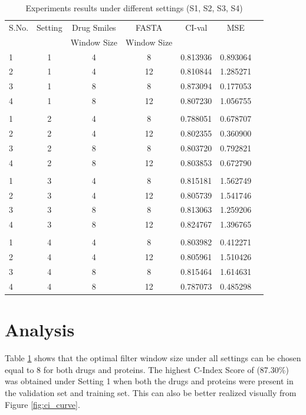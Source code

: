 \begin{table}[tbp]
    \centering
    \caption{Experiments results under different settings (S1, S2, S3, S4)}
    \begin{tabular}{|l|c|c|c|c|c|c|}
    \hline 
    
     S.No. & Setting & Drug Smiles & FASTA &  CI-val & MSE  \\ 
       &   & Window Size &  Window Size    & &    \\  \toprule \hline
     1 & 1 & 4 & 8 & 0.813936 & 0.893064 \\ \hline
     2 & 1 & 4 & 12 & 0.810844 & 1.285271 \\ \hline
     3 & 1 & 8 & 8 & 0.873094 & 0.177053 \\ \hline
     4 & 1 & 8 & 12 & 0.807230 & 1.056755 \\ \hline
     \\ \hline
     1 & 2 & 4 & 8 & 0.788051 & 0.678707 \\ \hline
     2 & 2 & 4 & 12 & 0.802355 & 0.360900 \\ \hline
     3 & 2 & 8 & 8 & 0.803720 & 0.792821 \\ \hline
     4 & 2 & 8 & 12 & 0.803853 & 0.672790 \\ \hline
     \\ \hline
     1 & 3 & 4 & 8 & 0.815181 & 1.562749 \\ \hline
     2 & 3 & 4 & 12 & 0.805739 & 1.541746 \\ \hline
     3 & 3 & 8 & 8 & 0.813063 & 1.259206 \\ \hline
     4 & 3 & 8 & 12 & 0.824767 & 1.396765 \\ \hline
     \\ \hline
     1 & 4 & 4 & 8 & 0.803982 & 0.412271 \\ \hline
     2 & 4 & 4 & 12 & 0.805961 & 1.510426 \\ \hline
     3 & 4 & 8 & 8 & 0.815464 & 1.614631 \\ \hline
     4 & 4 & 8 & 12 & 0.787073 & 0.485298 \\ \hline
     
    
    
    \end{tabular}
    \label{table:results}
\end{table}

\section{Analysis}
Table \ref{table:results} shows that the optimal filter window size under all settings can be chosen equal to 8 for both drugs and proteins. The highest C-Index Score of (87.30\%) was obtained under Setting 1 when both the drugs and proteins were present in the validation set and training set. This can also be better realized visually from Figure \ref{fig:ci_curve}.
 
